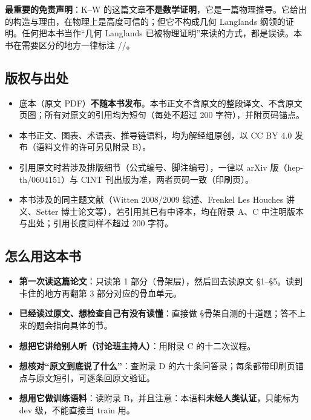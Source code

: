\begin{warn}
\textbf{最重要的免责声明}：K--W 的这篇文章\textbf{不是数学证明}，它是一篇物理推导。它给出的构造与理由，在物理上是高度可信的；但它不构成几何 Langlands 纲领的证明。任何把本书当作“几何 Langlands 已被物理证明”来读的方式，都是误读。本书在需要区分的地方一律标注 \pA/\pB/\pC。
\end{warn}

\subsection*{版权与出处}

\begin{itemize}
\item 底本（原文 PDF）\textbf{不随本书发布}。本书正文不含原文的整段译文、不含原文页图；所有对原文的引用均为短句（每处不超过 200 字符），并附页码锚点。
\item 本书正文、图表、术语表、推导链语料，均为解经组原创，以 CC BY 4.0 发布（语料文件的许可另见附录 B）。
\item 引用原文时若涉及排版细节（公式编号、脚注编号），一律以 arXiv 版（hep-th/0604151）与 CINT 刊出版为准，两者页码一致（印刷页）。
\item 本书涉及的同主题文献（Witten 2008/2009 综述、Frenkel Les Houches 讲义、Setter 博士论文等），若引用其已有中译本，均在附录 A、C 中注明版本与出处；引用长度同样不超过 200 字符。
\end{itemize}

\subsection*{怎么用这本书}

\begin{itemize}
\item \textbf{第一次读这篇论文}：只读第 1 部分（骨架层），然后回去读原文 §1--§5。读到卡住的地方再翻第 3 部分对应的骨血单元。
\item \textbf{已经读过原文、想检查自己有没有读懂}：直接做 \S 骨架自测的十道题；答不上来的题会指向具体的节。
\item \textbf{想把它讲给别人听（讨论班主持人）}：用附录 C 的十二次议程。
\item \textbf{想核对“原文到底说了什么”}：查附录 D 的六十条问答录；每条都带印刷页锚点与原文短引，可逐条回原文验证。
\item \textbf{想用它做训练语料}：读附录 B，并且注意：本语料\textbf{未经人类认证}，只能标为 dev 级，不能直接当 train 用。
\end{itemize}


